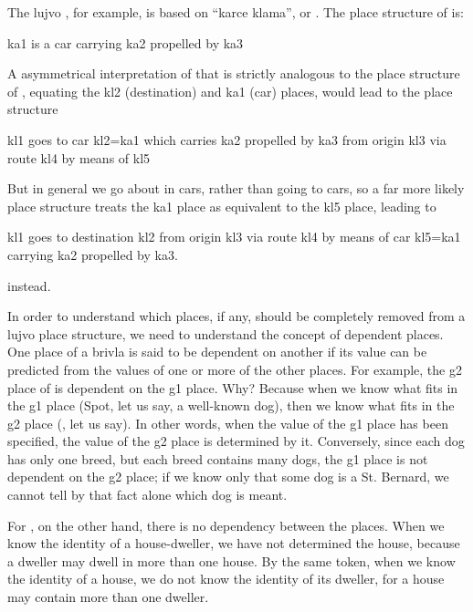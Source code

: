 The lujvo , for example, is based on ``karce
    klama'', or . The place structure of 
    is:
\begin{example}
ka1 is a car carrying ka2 propelled by ka3
\end{example}

A asymmetrical interpretation of  that is
    strictly analogous to the place structure of ,
    equating the kl2 (destination) and ka1 (car) places, would lead
    to the place structure
\begin{example}
kl1 goes to car kl2=ka1 which carries ka2\n
\T	propelled by ka3 from origin kl3\n
\T	via route kl4 by means of kl5
\end{example}

But in general we go about in cars, rather than going to
    cars, so a far more likely place structure treats the ka1 place
    as equivalent to the kl5 place, leading to
\begin{example}
kl1 goes to destination kl2 from origin kl3\n
\T	via route kl4 by means of car kl5=ka1\n
\T	carrying ka2 propelled by ka3.
\end{example}

{\noindent}instead.



In order to understand which places, if any, should be
    completely removed from a lujvo place structure, we need to
    understand the concept of dependent places. One place of a
    brivla is said to be dependent on another if its value can be
    predicted from the values of one or more of the other places.
    For example, the g2 place of  is dependent on the g1
    place. Why? Because when we know what fits in the g1 place
    (Spot, let us say, a well-known dog), then we know what fits in
    the g2 place (, let us say). In other words,
    when the value of the g1 place has been specified, the value of
    the g2 place is determined by it. Conversely, since each dog
    has only one breed, but each breed contains many dogs, the g1
    place is not dependent on the g2 place; if we know only that
    some dog is a St. Bernard, we cannot tell by that fact alone
    which dog is meant.

For , on the other hand, there is no dependency
    between the places. When we know the identity of a
    house-dweller, we have not determined the house, because a
    dweller may dwell in more than one house. By the same token,
    when we know the identity of a house, we do not know the
    identity of its dweller, for a house may contain more than one
    dweller.

